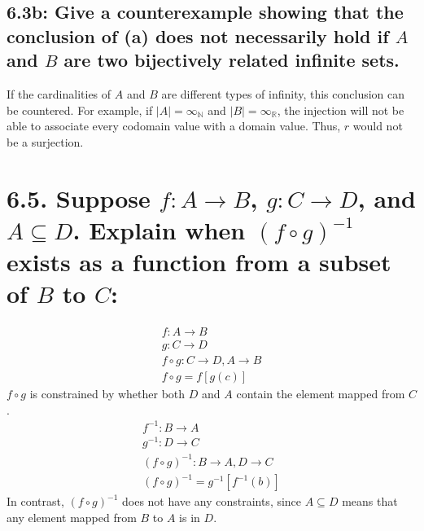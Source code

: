 \documentclass{article}
\begin{document}
\subsection*{6.3b: Give a counterexample showing that the conclusion of (a) does not necessarily hold if $A$ and $B$ are two bijectively related infinite sets.}
If the cardinalities of $A$ and $B$ are different types of infinity, this conclusion can be countered. For example, if $|A|=\infty_\mathbb{N}$ and $|B|=\infty_\mathbb{R}$, the injection will not be able to associate every codomain value with a domain value. Thus, $r$ would not be a surjection.
\section*{6.5. Suppose $f:A\rightarrow B$, $g:C\rightarrow D$, and $A\subseteq D$. Explain when $(f\circ g)^{-1}$ exists as a function from a subset of $B$ to $C$:}
\begin{align*}
  f:A\rightarrow B\\
  g:C\rightarrow D\\
  f\circ g:C\rightarrow D,A\rightarrow B\\
  f\circ g=f[g(c)]
\end{align*}
$f\circ g$ is constrained by whether both $D$ and $A$ contain the element mapped from $C$.
\begin{align*}
  f^{-1}:B\rightarrow A\\
  g^{-1}:D\rightarrow C\\
  (f\circ g)^{-1}: B\rightarrow A,D\rightarrow C\\
  (f\circ g)^{-1}=g^{-1}[f^{-1}(b)]
\end{align*}
In contrast, $(f\circ g)^{-1}$ does not have any constraints, since $A\subseteq D$ means that any element mapped from $B$ to $A$ is in $D$.
\end{document}
